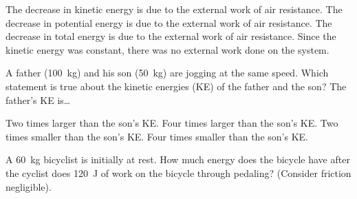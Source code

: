 \documentclass[answers,dvipsnames]{exam}
\begin{document}
\begin{questions}
\begin{center}
    \hspace{1cm}
\end{center}

\begin{randomizechoices}[norandomize]
    \choice The decrease in kinetic energy is due to the external work of air resistance.
    \choice The decrease in potential energy is due to the external work of air resistance.
    \correctchoice The decrease in total energy is due to the external work of air resistance.
    \choice Since the kinetic energy was constant, there was no external work done on the system.
\end{randomizechoices}


\question
A father (\SI{100}{kg}) and his son (\SI{50}{kg}) are jogging at the same speed. Which statement is true about the kinetic energies (KE) of the father and the son? The father's KE is\dots

\begin{randomizechoices}[norandomize]
    \correctchoice Two times larger than the son's KE.
    \choice Four times larger than the son's KE.   
    \choice Two times smaller than the son's KE.
    \choice Four times smaller than the son's KE.
\end{randomizechoices}

\question
A \SI{60}{kg} bicyclist is initially at rest. How much energy does the bicycle have after the cyclist does \SI{120}{J} of work on the bicycle through pedaling? (Consider friction negligible).


\end{questions}
\end{document}
